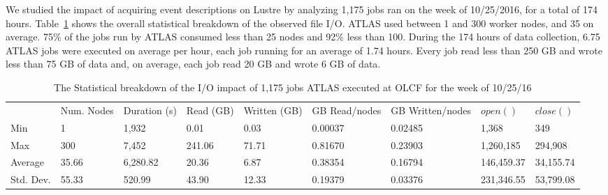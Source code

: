 We studied the impact of acquiring event descriptions on Lustre by analyzing
1,175 jobs ran on the week of 10/25/2016, for a total of 174 hours.
Table~\ref{panda-olcf-stats} shows the overall statistical breakdown of the
observed file I/O.
%
%
ATLAS used between 1 and 300 worker nodes, and 35 on average. 75\% of the jobs
run by ATLAS consumed less than 25 nodes and 92\% less than 100. During the 174
hours of data collection, 6.75 ATLAS jobs were executed on average per hour,
each job running for an average of 1.74 hours.
Every job read less than 250 GB and wrote less than 75 GB of data and, on
average, each job read 20 GB and wrote 6 GB of data.

\begin{table}[t]
\centering
\begin{tabular}{lllllllll}
 & Num. Nodes & Duration (s) & Read (GB) & Written (GB) & GB Read/nodes & GB Written/nodes & $open()$ & $close()$ \\
Min & 1 & 1,932 & 0.01 & 0.03 & 0.00037 & 0.02485 & 1,368 & 349 \\
Max & 300 & 7,452 & 241.06 & 71.71 & 0.81670 & 0.23903 & 1,260,185 & 294,908 \\
Average & 35.66 & 6,280.82 & 20.36 & 6.87 & 0.38354 & 0.16794 & 146,459.37 & 34,155.74 \\
Std. Dev. & 55.33 & 520.99 & 43.90 & 12.33 & 0.19379 & 0.03376 & 231,346.55 & 53,799.08
\end{tabular}
\caption{The Statistical breakdown of the I/O impact of 1,175 jobs ATLAS executed at OLCF for the week of 10/25/16}
\label{panda-olcf-stats}
\end{table}

%

